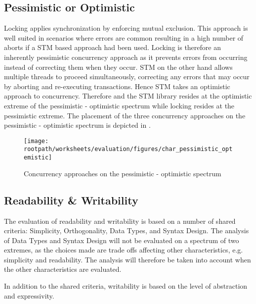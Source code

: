 \subsection{Pessimistic or Optimistic}
Locking applies synchronization by enforcing mutual exclusion. This approach is well suited in scenarios where errors are common resulting in a high number of aborts if a \ac{STM} based approach had been used. Locking is therefore an inherently pessimistic concurrency approach as it prevents errors from occurring instead of correcting them when they occur. \ac{STM} on the other hand allows multiple threads to proceed simultaneously, correcting any errors that may occur by aborting and re-executing transactions. Hence \ac{STM} takes an optimistic approach to concurrency.
Therefore \stmnamesp and the \ac{STM} library resides at the optimistic extreme of the pessimistic - optimistic spectrum while locking resides at the pessimistic extreme. The placement of the three concurrency approaches on the pessimistic - optimistic spectrum is depicted in . 
\begin{figure}[htbp]
\centering
 \texttt{[image: \\rootpath/worksheets/evaluation/figures/char\_pessimistic\_optemistic]} 
 \caption{Concurrency approaches on the pessimistic - optimistic spectrum}
\label{fig:char_pes_opti}
\end{figure}

\subsection{Readability \& Writability}\label{subsec:tl_charac_read_and_write}
The evaluation of readability and writability is based on a number of shared criteria: Simplicity, Orthogonality, Data Types, and Syntax Design. The analysis of Data Types and Syntax Design will not be evaluated on a spectrum of two extremes, as the choices made are trade offs affecting other characteristics, e.g. simplicity and readability. The analysis will therefore be taken into account when the other characteristics are evaluated.

In addition to the shared criteria, writability is based on the level of abstraction and expressivity.
